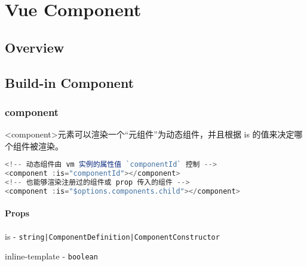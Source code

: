 \part{Vue Component}


\chapter{Overview}



\chapter{Build-in Component}




\section{component}

<component>元素可以渲染一个“元组件”为动态组件，并且根据 is 的值来决定哪个组件被渲染。

\begin{lstlisting}[language=JavaScript]
<!-- 动态组件由 vm 实例的属性值 `componentId` 控制 -->
<component :is="componentId"></component>
<!-- 也能够渲染注册过的组件或 prop 传入的组件 -->
<component :is="$options.components.child"></component>
\end{lstlisting}

\subsection{Props}

\begin{compactitem}
\item is - \texttt{string|ComponentDefinition|ComponentConstructor}
\item inline-template - \texttt{boolean}
\end{compactitem}






\begin{lstlisting}[language=JavaScript]

\end{lstlisting}




\begin{lstlisting}[language=JavaScript]

\end{lstlisting}




